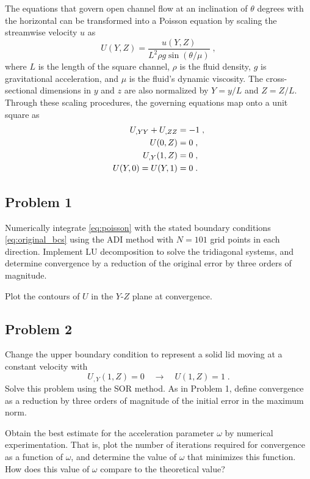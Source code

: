 \documentclass[11pt]{article}
\begin{document}
The equations that govern open channel flow at an inclination of $\theta$ degrees with the horizontal can be transformed into a Poisson equation by scaling the streamwise velocity $u$ as
\begin{equation}
U(Y,Z) = \frac{u(Y,Z)}{L^2 \rho g \sin(\theta / \mu)}
\;,
\end{equation}
where $L$ is the length of the square channel, $\rho$ is the fluid density, $g$ is gravitational acceleration, and $\mu$ is the fluid's dynamic viscosity. The cross-sectional dimensions in $y$ and $z$ are also normalized by $Y = y/L$ and $Z = Z/L$. Through these scaling procedures, the governing equations map onto a unit square as
\begin{align}
U_{,YY} + U_{,ZZ} &= -1
\;, \label{eq:poisson} \\
U(0,Z) &= 0
\;, \notag\\
U_{,Y}(1,Z) &= 0
\;, \notag\\
U(Y,0) = U(Y,1) &= 0
\;.
\label{eq:original_bcs}
\end{align}

\subsection{Problem 1}

Numerically integrate \eqref{eq:poisson} with the stated boundary conditions \eqref{eq:original_bcs} using the ADI method with $N = 101$ grid points in each direction. Implement LU decomposition to solve the tridiagonal systems, and determine convergence by a reduction of the original error by three orders of magnitude.

Plot the contours of $U$ in the $Y$-$Z$ plane at convergence.

\subsection{Problem 2}

Change the upper boundary condition to represent a solid lid moving at a constant velocity with
\begin{equation}
U_{,Y}(1,Z) = 0 \quad\longrightarrow\quad U(1,Z) = 1
\;.
\end{equation}
Solve this problem using the SOR method. As in Problem 1, define convergence as a reduction by three orders of magnitude of the initial error in the maximum norm.

Obtain the best estimate for the acceleration parameter $\omega$ by numerical experimentation. That is, plot the number of iterations required for convergence as a function of $\omega$, and determine the value of $\omega$ that minimizes this function. How does this value of $\omega$ compare to the theoretical value?
\end{document}
